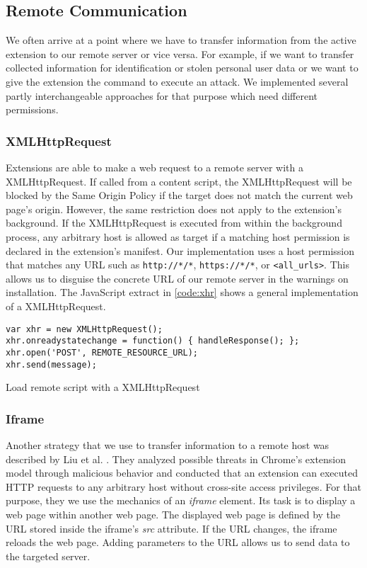 \subsection{Remote Communication}

	We often arrive at a point where we have to transfer information from the active extension to our remote server or vice versa. For example, if we want to transfer collected information for identification or stolen personal user data or we want to give the extension the command to execute an attack. We implemented several partly interchangeable approaches for that purpose which need different permissions. 

\subsubsection{XMLHttpRequest}
\label{sec:xhrCommunication}

	Extensions are able to make a web request to a remote server with a XMLHttpRequest. If called from a content script, the XMLHttpRequest will be blocked by the Same Origin Policy if the target does not match the current web page's origin. However, the same restriction does not apply to the extension's background. If the XMLHttpRequest is executed from within the background process, any arbitrary host is allowed as target if a matching host permission is declared in the extension's manifest. Our implementation uses a host permission that matches any URL such as \texttt{http://*/*}, \texttt{https://*/*}, or \texttt{<all\_urls>}. This allows us to disguise the concrete URL of our remote server in the warnings on installation. The JavaScript extract in \autoref{code:xhr} shows a general implementation of a XMLHttpRequest. 
	
	\begin{code}
		\begin{lstlisting}
var xhr = new XMLHttpRequest();
xhr.onreadystatechange = function() { handleResponse(); };
xhr.open('POST', REMOTE_RESOURCE_URL);
xhr.send(message);
		\end{lstlisting}
		\caption{Load remote script with a XMLHttpRequest}
		\label{code:xhr}
	\end{code}

\subsubsection{Iframe}

	Another strategy that we use to transfer information to a remote host was described by Liu et al. \cite{Liu12chromeextensions:}. They analyzed possible threats in Chrome's extension model through malicious behavior and conducted that an extension can executed HTTP requests to any arbitrary host without cross-site access privileges. For that purpose, they we use the mechanics of an \textit{iframe} element. Its task is to display a web page within another web page. The displayed web page is defined by the URL stored inside the iframe's \textit{src} attribute. If the URL changes, the iframe reloads the web page. Adding parameters to the URL allows us to send data to the targeted server. 

